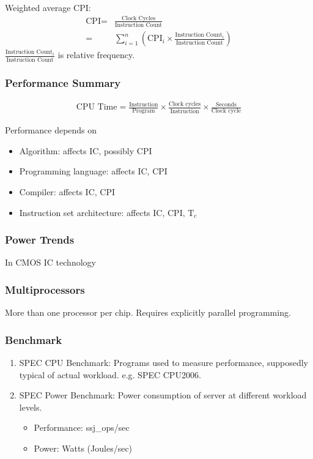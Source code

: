 Weighted average CPI: 
\begin{align*}
    \text{CPI}=&\frac{\text{Clock Cycles}}{\text{Instruction Count}}\\
    =&\sum_{i=1}^n \left( \text{CPI}_i \times \frac{\text{Instruction Count}_i}{\text{Instruction Count}} \right)
\end{align*}
$\displaystyle \frac{\text{Instruction Count}_i}{\text{Instruction Count}} $ is relative frequency. 

\subsubsection{Performance Summary}
\begin{align*}
    \text{CPU Time}=\frac{\text{Instruction}}{\text{Program}}\times \frac{\text{Clock cycles}}{\text{Instruction}}\times \frac{\text{Seconds}}{\text{Clock cycle}}
\end{align*}

Performance depends on
\begin{itemize}
    \item Algorithm: affects IC, possibly CPI
    \item Programming language: affects IC, CPI
    \item Compiler: affects IC, CPI
    \item Instruction set architecture: affects IC, CPI, $\text{T}_c$
\end{itemize}

\subsubsection{Power Trends}
In CMOS IC technology


\subsubsection{Multiprocessors}
More than one processor per chip. Requires explicitly parallel programming. 

\subsubsection{Benchmark}
\begin{enumerate}
    \item SPEC CPU Benchmark: Programs used to measure performance, supposedly typical of actual workload. e.g. SPEC CPU2006. 
    \item SPEC Power Benchmark: Power consumption of server at different workload levels. 
    \begin{itemize}
        \item Performance: ssj\_ops/sec
        \item Power: Watts (Joules/sec)
    \end{itemize}
\end{enumerate}

